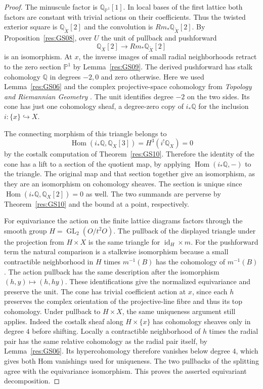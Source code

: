 \documentclass[11pt,oneside,openany]{book}
\theoremstyle{definition}
\theoremstyle{remark}
\begin{document}
\begin{proof}
The minuscule factor is \(\mathbb Q_{\mathbb P^1}[1]\).
In local bases of the first lattice both factors are constant
with trivial actions on their coefficients. Thus the twisted
exterior square is \(\mathbb Q_{\widetilde X}[2]\) and the convolution is
\(Rm_*\mathbb Q_{\widetilde X}[2]\). By
Proposition~\ref{res:GS08}, over \(U\) the unit of pullback
and pushforward
\[
 \mathbb Q_X[2]\longrightarrow Rm_*\mathbb Q_{\widetilde X}[2]
\]
is an isomorphism. At \(x\), the inverse images of
small radial neighborhoods retract to the zero section
\(\mathbb P^1\) by Lemma~\ref{res:GS09}. The derived
pushforward has stalk cohomology \(\mathbb Q\) in degrees
\(-2,0\) and zero otherwise. Here we used
Lemma~\ref{res:GS06} and the complex projective-space
cohomology from \emph{Topology and Riemannian Geometry}
\cite[Proposition 4.3 and Theorem 4.13,
PDF pp.~24 and 29]{mg-topriem}. The unit identifies degree
\(-2\) on the two sides. Its cone has just one cohomology
sheaf, a degree-zero copy of \(i_*\mathbb Q\) for the
inclusion \(i:\{x\}\hookrightarrow X\).

The connecting morphism of this triangle belongs to
\[
 \operatorname{Hom}(i_*\mathbb Q,\mathbb Q_X[3])
   = H^3(i^!\mathbb Q_X)=0
\]
by the costalk computation of Theorem~\ref{res:GS10}.
Therefore the identity of the cone has a lift to a section
of the quotient map, by applying \(\operatorname{Hom}(i_*\mathbb Q,-)\)
to the triangle. The original map and that section together
give an isomorphism, as they are an isomorphism on
cohomology sheaves. The section is unique since
\(\operatorname{Hom}(i_*\mathbb Q,\mathbb Q_X[2])=0\) as well.
The two summands are perverse by Theorem~\ref{res:GS10}
and the bound at a point, respectively.

For equivariance the action on the finite lattice diagrams
factors through the smooth group \(H=\operatorname{GL}_2(O/t^2O)\).
The pullback of the displayed triangle under the projection
from \(H\times X\) is the same triangle for
\(\operatorname{id}_H\times m\). For the pushforward term
the natural comparison is a stalkwise isomorphism because a
small contractible neighborhood in \(H\) times \(m^{-1}(B)\)
has the cohomology of \(m^{-1}(B)\).
The action pullback has the same description after
the isomorphism \((h,y)\mapsto(h,hy)\).
These identifications give the normalized equivariance
and preserve the unit. The cone has trivial coefficient
action at \(x\), since each \(h\) preserves the complex
orientation of the projective-line fibre and thus its
top cohomology. Under pullback to \(H\times X\), the
same uniqueness argument still applies. Indeed the
costalk sheaf along \(H\times\{x\}\) has cohomology
sheaves only in degree \(4\) before shifting. Locally a
contractible neighborhood of \(h\) times
the radial pair has the same relative cohomology
as the radial pair itself, by Lemma~\ref{res:GS06}.
Its hypercohomology therefore vanishes below degree \(4\),
which gives both Hom vanishings used for uniqueness.
The two pullbacks of the splitting agree with the
equivariance isomorphism. This proves the asserted
equivariant decomposition.
\end{proof}
\end{document}
